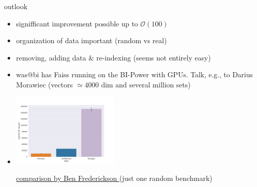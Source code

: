 \documentclass[xcolor=dvipsnames, aspectratio=1610]{beamer}
\newcommand{\alertA}[1]{\color{alertAcolor}#1\color{Black}}
\newcommand{\alertB}[1]{{\color{AlertcolB}#1}}
\newcommand{\gr}[1]{{\color{grcol}#1}}
\newcommand{\citeWork}[1]{ {\scriptsize{\color{Refcol} #1  \color{Black}}}}
\begin{document}
\begin{frame}{outlook } 
\linespread{1}\small{
\begin{minipage}{0.99\textwidth}  

\begin{itemize}
\item signifficant improvement possible up to \alertA{$\mathcal O (100)$}
\item organization of data important \alertA{(random vs real)}
\item removing, adding data \& re-indexing \alertB{(seems not entirely easy)}
\item was@bi has Faiss running on the BI-Power with GPUs. Talk, e.g., to \alertB{Darius Morawiec} (vectors $\simeq 4000$ dim and several million sets)
\item \includegraphics[width=0.4\textwidth]{Figures/faiss_gpu.png} 

\href{https://www.benfrederickson.com/approximate-nearest-neighbours-for-recommender-systems/}{\citeWork{comparison by Ben Frederickson}} \gr{(just one random benchmark)}
\end{itemize}
\end{minipage}
}
\end{frame}
\end{document}
